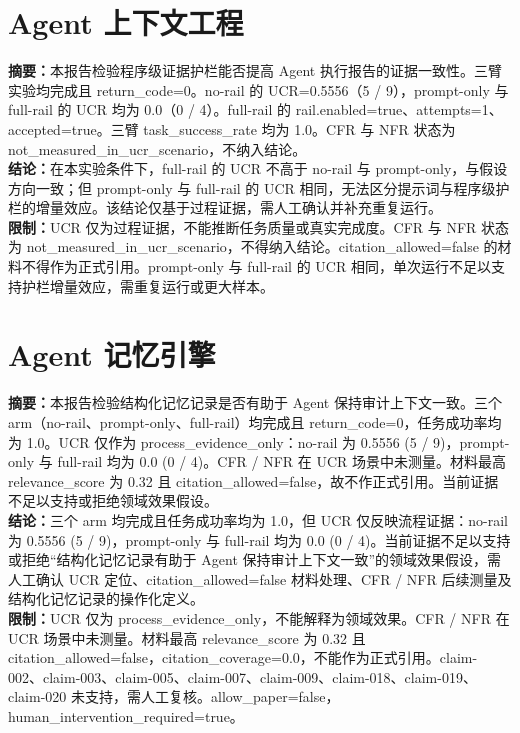 \documentclass[UTF8]{ctexart}
\begin{document}
\section{Agent 上下文工程}
\textbf{摘要：}本报告检验程序级证据护栏能否提高 Agent 执行报告的证据一致性。三臂实验均完成且 return\_\allowbreak{}code=0。no-\allowbreak{}rail 的 UCR=0.5556（5 / 9），prompt-\allowbreak{}only 与 full-\allowbreak{}rail 的 UCR 均为 0.0（0 / 4）。full-\allowbreak{}rail 的 rail.enabled=true、attempts=1、accepted=true。三臂 task\_\allowbreak{}success\_\allowbreak{}rate 均为 1.0。CFR 与 NFR 状态为 not\_\allowbreak{}measured\_\allowbreak{}in\_\allowbreak{}ucr\_\allowbreak{}scenario，不纳入结论。\\
\textbf{结论：}在本实验条件下，full-\allowbreak{}rail 的 UCR 不高于 no-\allowbreak{}rail 与 prompt-\allowbreak{}only，与假设方向一致；但 prompt-\allowbreak{}only 与 full-\allowbreak{}rail 的 UCR 相同，无法区分提示词与程序级护栏的增量效应。该结论仅基于过程证据，需人工确认并补充重复运行。\\
\textbf{限制：}UCR 仅为过程证据，不能推断任务质量或真实完成度。CFR 与 NFR 状态为 not\_\allowbreak{}measured\_\allowbreak{}in\_\allowbreak{}ucr\_\allowbreak{}scenario，不得纳入结论。citation\_\allowbreak{}allowed=false 的材料不得作为正式引用。prompt-\allowbreak{}only 与 full-\allowbreak{}rail 的 UCR 相同，单次运行不足以支持护栏增量效应，需重复运行或更大样本。
\section{Agent 记忆引擎}
\textbf{摘要：}本报告检验结构化记忆记录是否有助于 Agent 保持审计上下文一致。三个 arm（no-\allowbreak{}rail、prompt-\allowbreak{}only、full-\allowbreak{}rail）均完成且 return\_\allowbreak{}code=0，任务成功率均为 1.0。UCR 仅作为 process\_\allowbreak{}evidence\_\allowbreak{}only：no-\allowbreak{}rail 为 0.5556 (5 / 9)，prompt-\allowbreak{}only 与 full-\allowbreak{}rail 均为 0.0 (0 / 4)。CFR / NFR 在 UCR 场景中未测量。材料最高 relevance\_\allowbreak{}score 为 0.32 且 citation\_\allowbreak{}allowed=false，故不作正式引用。当前证据不足以支持或拒绝领域效果假设。\\
\textbf{结论：}三个 arm 均完成且任务成功率均为 1.0，但 UCR 仅反映流程证据：no-\allowbreak{}rail 为 0.5556 (5 / 9)，prompt-\allowbreak{}only 与 full-\allowbreak{}rail 均为 0.0 (0 / 4)。当前证据不足以支持或拒绝“结构化记忆记录有助于 Agent 保持审计上下文一致”的领域效果假设，需人工确认 UCR 定位、citation\_\allowbreak{}allowed=false 材料处理、CFR / NFR 后续测量及结构化记忆记录的操作化定义。\\
\textbf{限制：}UCR 仅为 process\_\allowbreak{}evidence\_\allowbreak{}only，不能解释为领域效果。CFR / NFR 在 UCR 场景中未测量。材料最高 relevance\_\allowbreak{}score 为 0.32 且 citation\_\allowbreak{}allowed=false，citation\_\allowbreak{}coverage=0.0，不能作为正式引用。claim-\allowbreak{}002、claim-\allowbreak{}003、claim-\allowbreak{}005、claim-\allowbreak{}007、claim-\allowbreak{}009、claim-\allowbreak{}018、claim-\allowbreak{}019、claim-\allowbreak{}020 未支持，需人工复核。allow\_\allowbreak{}paper=false，human\_\allowbreak{}intervention\_\allowbreak{}required=true。
\end{document}
